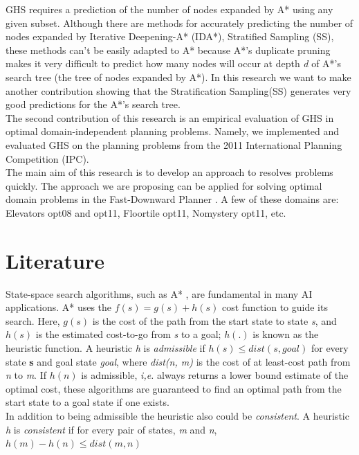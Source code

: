 \documentclass[11pt,a4paper,oneside]{report}
\begin{document}
GHS requires a prediction of the number of nodes expanded by A* using any given subset. Although there are methods for accurately predicting the number of nodes expanded by Iterative Deepening-A* \citep{korf2001timecomplexity} (IDA*), Stratified Sampling \citep{lelis2013predicting} (SS), these methods can't be easily adapted to A* because A*'s duplicate pruning makes it very difficult to predict how many nodes will occur at depth \textit{d} of A*'s search tree (the tree of nodes expanded by A*). In this research we want to make another contribution showing that the Stratification Sampling(SS) generates very good predictions for the A*'s search tree.\\

The second contribution of this research is an empirical evaluation of GHS in optimal domain-independent planning problems. Namely, we implemented and evaluated GHS on the planning problems from the 2011 International Planning Competition (IPC).\\

The main aim of this research is to develop an approach to resolves problems quickly. The approach we are proposing can be applied for solving optimal domain problems in the Fast-Downward Planner \citep{helmert2006fast}. A few of these domains are: Elevators opt08 and opt11, Floortile opt11, Nomystery opt11, etc.
\\

\section{Literature}
State-space search algorithms, such as A* \citep{hart1968formal}, are fundamental in many AI applications. A* uses the $f(s) = g(s) + h(s)$ cost function to guide its search. Here, $g(s)$ is the cost of the path from the start state to state \textit{s}, and $h(s)$ is the estimated cost-to-go from \textit{s} to a goal; $h(.)$ is known as the heuristic function. A heuristic \textit{h} is \textit{admissible} if $h(s) \leq dist(s, goal)$ for every state \textbf{s} and goal state \textit{goal}, where \textit{dist(n, m)} is the cost of at least-cost path from \textit{n} to \textit{m}. If $h(n)$ is admissible, \textit{i,e.} always returns a lower bound estimate of the optimal cost, these algorithms are guaranteed to find an optimal path from the start state to a goal state if one exists.\\

In addition to being admissible the heuristic also could be \textit{consistent}. A heuristic \textit{h} is \textit{consistent} if for every pair of states, \textit{m} and \textit{n}, $h(m) - h(n) \leq dist(m, n)$
\end{document}
